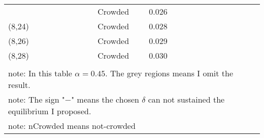 \documentclass[12pt,letter]{article}
\theoremstyle{remark}
\theoremstyle{remark}
\theoremstyle{claim}
\begin{document}
\begin{table}[htbp]
\begin{tabular}{lrcccccc}
 & Crowded & 0.026 & \cellcolor{Gray} & \cellcolor{Gray} & \cellcolor{Gray} & \cellcolor{Gray} & \cellcolor{Gray}\\ 
(8,24) & Crowded & 0.028 & \cellcolor{Gray} & \cellcolor{Gray} & \cellcolor{Gray} & \cellcolor{Gray} & \cellcolor{Gray}\\ 
(8,26) & Crowded & 0.029 & \cellcolor{Gray} & \cellcolor{Gray} & \cellcolor{Gray} & \cellcolor{Gray} & \cellcolor{Gray}\\ 
(8,28) & Crowded & 0.030 & \cellcolor{Gray} & \cellcolor{Gray} & \cellcolor{Gray} & \cellcolor{Gray} & \cellcolor{Gray}\\ \hline
 &  &  &  &  &  &  & \\ \hline \hline
 \multicolumn{8}{l}{note: In this table $\alpha=0.45$. The grey regions means I omit the result.}\\
 \multicolumn{8}{l}{note: The sign "$-$" means the chosen $\delta$ can not sustained the equilibrium I proposed.}\\
  \multicolumn{8}{l}{note: nCrowded means not-crowded}
\end{tabular}
\end{table}
\end{document}
